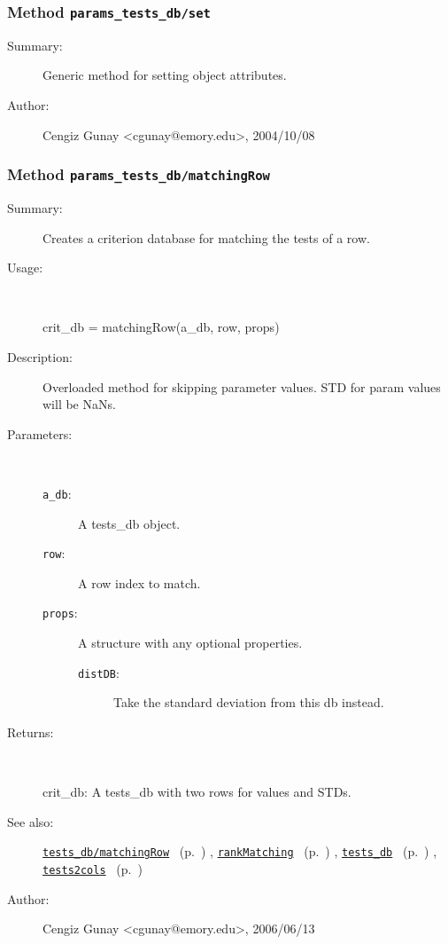 \subsubsection[Method \texttt{set}]{Method \texttt{params\_tests\_db/set}}%
%
\label{ref_params_tests_db__set}%
\hypertarget{ref_params_tests_db__set}{}%
\begin{description}
\item[Summary:]Generic method for setting object attributes.
%
%
%
%
%
%
%
\item[Author:]%
Cengiz Gunay <cgunay@emory.edu>, 2004/10/08%
\end{description}
\methodline%
\subsubsection[Method \texttt{matchingRow}]{Method \texttt{params\_tests\_db/matchingRow}}%
%
\label{ref_params_tests_db__matchingRow}%
\hypertarget{ref_params_tests_db__matchingRow}{}%
\begin{description}
\item[Summary:]Creates a criterion database for matching the tests of a row.
%
\item[Usage:]~%
\begin{lyxcode}%
crit\_db = matchingRow(a\_db, row, props)
%
\end{lyxcode}%
%
\item[Description:]%
Overloaded method for skipping parameter values. STD for param values will be NaNs.
\item[Parameters:]~
\begin{description}%
\item[\texttt{a\_db}:]
 A tests\_db object.
\item[\texttt{row}:]
 A row index to match.
\item[\texttt{props}:]
 A structure with any optional properties.
\begin{description}%
\item[\texttt{distDB}:]
 Take the standard deviation from this db instead.
\end{description}%
\end{description}%
%
\item[Returns:]~

	crit\_db: A tests\_db with two rows for values and STDs.
%
%
\item[See also:]%
\hyperlink{ref_tests_db__matchingRow}{\texttt{tests\_db/matchingRow}}%
\ (p.~\pageref{ref_tests_db__matchingRow})%
%
, \hyperlink{ref_rankMatching}{\texttt{rankMatching}}%
\ (p.~\pageref{ref_rankMatching})%
%
, \hyperlink{ref_tests_db}{\texttt{tests\_db}}%
\ (p.~\pageref{ref_tests_db})%
%
, \hyperlink{ref_tests2cols}{\texttt{tests2cols}}%
\ (p.~\pageref{ref_tests2cols})%
%
%
\item[Author:]%
Cengiz Gunay <cgunay@emory.edu>, 2006/06/13%
\end{description}
\methodline%
